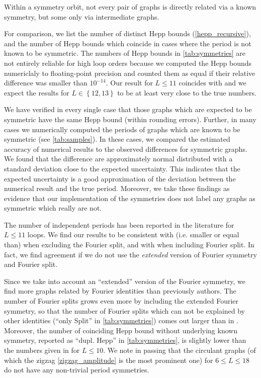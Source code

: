 \documentclass[12pt,a4paper]{article}
\renewcommand{\|}{\rule[-0.4ex]{0.2ex}{1.2em}}
\begin{document}
Within a symmetry orbit, not every pair of graphs is directly related via a known symmetry, but some only via intermediate graphs. 


For comparison, we list the number of distinct Hepp bounds (\cref{hepp_recursive}), and the number of Hepp bounds which coincide in cases where the period is not known to be symmetric.
The numbers of Hepp bounds in \cref{tab:symmetries} are not entirely reliable for high loop orders because we computed the Hepp bounds numericlaly to floating-point precision and counted them as equal if their relative difference was smaller than $10^{-14}$. Our result for $L\leq 11$ coincides with \cite{panzer_hepp_2022} and we expect the results for $L\in \left \lbrace 12,13 \right \rbrace $ to be at least very close to the true numbers.


We have verified in every single case that those graphs which are expected to be symmetric have the same Hepp bound (within rounding errors). Further, in many cases we numerically computed the periods of graphs which are known to be symmetric (see \cref{tab:samples}). In these cases, we compared the estimated accuracy of numerical results to the observed differences for symmetric graphs. We found that the difference are approximately normal distributed with a standard deviation close to the expected uncertainty. This indicates that the expected uncertainty is a good approximation of the deviation between the numerical result and the true period. Moreover, we take these findings as evidence that our implementation of the symmetries does not label any graphs as symmetric which really are not. 

The number of independent periods has been reported in the literature for $L\leq 11$ loops. We find our results to be  consistent  with  (i.e. smaller or equal than)   \cite{schnetz_quantum_2010} when excluding the Fourier split, and  with \cite{hu_further_2022} when including Fourier split. In fact, we find agreement if we do not use the \emph{extended} version of Fourier symmetry and Fourier split.

Since we take into account an \enquote{extended} version of the Fourier symmetry, we find more graphs related by Fourier identities than previously authors. The number of Fourier splits grows even more by including the extended Fourier symmetry, so that the number of Fourier splits which can not be explained by other identities  (\enquote{only Split} in \cref{tab:symmetries}) comes out larger than in \cite{hu_further_2022}.
Moreover, the number of coinciding Hepp bound without underlying known symmetry, reported as \enquote{dupl. Hepp} in \cref{tab:symmetries}, is slightly lower than the numbers given in \cite[Table 3]{panzer_hepp_2022} for $L\leq 10$. We note in passing that the circulant graphs (of which the zigzag \cref{zigzag_amplitude} is the most prominent one) for $6 \leq L \leq 18$ do not have any non-trivial period symmetries.
\end{document}
